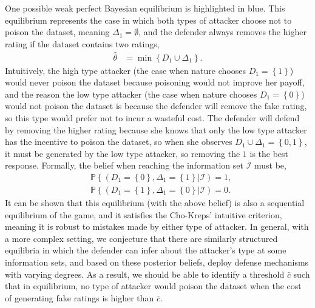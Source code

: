 \documentclass{article}
\begin{document}
One possible weak perfect Bayesian equilibrium is highlighted in blue. This equilibrium represents the case in which both types of attacker choose not to poison the dataset, meaning $\Delta_{1} = \emptyset$, and the defender always removes the higher rating if the dataset contains two ratings,
\begin{align*}
\hat{\theta} &= \displaystyle\min\left\{D_{1} \cup \Delta_{1}\right\}.
\end{align*}
Intuitively, the high type attacker (the case when nature chooses $D_{1} = \left\{1\right\}$) would never poison the dataset because poisoning would not improve her payoff, and the reason the low type attacker (the case when nature chooses $D_{1} = \left\{0\right\}$) would not poison the dataset is because the defender will remove the fake rating, so this type would prefer not to incur a wasteful cost. The defender will defend by removing the higher rating because she knows that only the low type attacker has the incentive to poison the dataset, so when she observes $D_{1} \cup \Delta_{1} = \left\{0, 1\right\}$, it must be generated by the low type attacker, so removing the $1$ is the best response. Formally, the belief when reaching the information set $\mathcal{I}$ must be,
\begin{align*}
&\mathbb{P}\left\{\left(D_{1} = \left\{0\right\}, \Delta_{1} = \left\{1\right\} | \mathcal{I}\right) = 1,\right.
\\ &\mathbb{P}\left\{\left(D_{1} = \left\{1\right\}, \Delta_{1} = \left\{0\right\} | \mathcal{I}\right) = 0.\right.
\end{align*}
It can be shown that this equilibrium (with the above belief) is also a sequential equilibrium of the game, and it satisfies the Cho-Kreps' intuitive criterion, meaning it is robust to mistakes made by either type of attacker.
\newline \newline
In general, with a more complex setting, we conjecture that there are similarly structured equilibria in which the defender can infer about the attacker's type at some information sets, and based on these posterior beliefs, deploy defense mechanisms with varying degrees. As a result, we should be able to identify a threshold $\bar{c}$ such that in equilibrium, no type of attacker would poison the dataset when the cost of generating fake ratings is higher than $\bar{c}$.
\newline \newline
\end{document}
